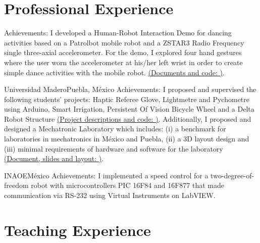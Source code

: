 \documentclass[10pt,a4paper,roman]{moderncv}
\begin{document}
\section{Professional Experience}

{Achievements: I developed a Human-Robot Interaction Demo for dancing activities based on 
a Patrolbot mobile robot and a ZSTAR3 Radio Frequency single three-axial accelerometer.
For the demo, I explored four hand gestures where the user worn the accelerometer at his/her 
left wrist in order to create simple dance activities with the mobile robot. 
\href{https://sites.google.com/site/perezxochicale/projects/demodance}{(Documents and code: \faExternalLink)}.
}

{Universidad Madero}{Puebla, M\'exico}{}
{Achievements:
I proposed and supervised the following students' projects: Haptic Referee Glove,
 Lightmetre and Pychometre using Arduino, Smart Irrigation, Persistent Of Vision Bicycle Wheel
 and a Delta Robot Structure 
\href{https://sites.google.com/site/perezxochicaleprojects/studentprojects}{(Project descriptions and code: \faExternalLink)}.
Additionally, I proposed and designed a Mechatronic Laboratory which includes: 
(i) a benchmark for laboratories in mechatronics in M\'exico and Puebla, 
(ii) a 3D layout design and 
(iii) minimal requirements of hardware and software for the laboratory
 \href{https://sites.google.com/site/perezxochicaleprojects/mechatronicslaboratorydesign}{(Document, slides and layout: \faExternalLink)}.
}

{INAOE}{M\'exico}{}
{Achievements:
I implemented a speed control for a two-degree-of-freedom robot with microcontrollers
PIC 16F84 and 16F877 that made communication via RS-232 using Virtual Instruments on LabVIEW.}



\section{Teaching Experience}
\end{document}
